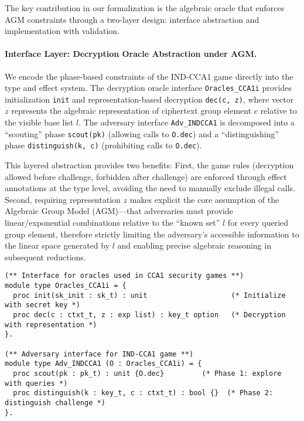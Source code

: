 The key contribution in our formalization is the algebraic oracle that enforces AGM constraints through a two-layer design: interface abstraction and implementation with validation.

\paragraph{Interface Layer: Decryption Oracle Abstraction under AGM.}

We encode the phase-based constraints of the IND-CCA1 game directly into the type and effect system. The decryption oracle interface \texttt{Oracles\_CCA1i} provides initialization \texttt{init} and representation-based decryption \texttt{dec(c, z)}, where vector $z$ represents the algebraic representation of ciphertext group element $c$ relative to the visible base list $l$. The adversary interface \texttt{Adv\_INDCCA1} is decomposed into a ``scouting'' phase \texttt{scout(pk)} (allowing calls to \texttt{O.dec}) and a ``distinguishing'' phase \texttt{distinguish(k, c)} (prohibiting calls to \texttt{O.dec}).

This layered abstraction provides two benefits: First, the game rules (decryption allowed before challenge, forbidden after challenge) are enforced through effect annotations at the type level, avoiding the need to manually exclude illegal calls. Second, requiring representation $z$ makes explicit the core assumption of the Algebraic Group Model (AGM)---that adversaries must provide linear/exponential combinations relative to the ``known set'' $l$ for every queried group element, therefore strictly limiting the adversary's accessible information to the linear space generated by $l$ and enabling precise algebraic reasoning in subsequent reductions.

\begin{lstlisting}[style=easycrypt, caption=Algebraic Oracle Interface, breaklines=true, breakatwhitespace=true, frame=single, keepspaces=true]
(** Interface for oracles used in CCA1 security games **)
module type Oracles_CCA1i = {
  proc init(sk_init : sk_t) : unit                    (* Initialize with secret key *)
  proc dec(c : ctxt_t, z : exp list) : key_t option   (* Decryption with representation *)
}.

(** Adversary interface for IND-CCA1 game **)
module type Adv_INDCCA1 (O : Oracles_CCA1i) = {
  proc scout(pk : pk_t) : unit {O.dec}         (* Phase 1: explore with queries *)
  proc distinguish(k : key_t, c : ctxt_t) : bool {}  (* Phase 2: distinguish challenge *)
}.
\end{lstlisting}

